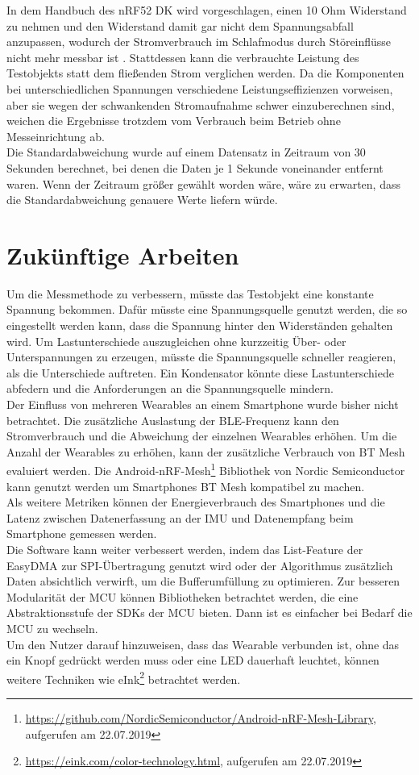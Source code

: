 In dem Handbuch des nRF52 DK wird vorgeschlagen, einen 10 Ohm Widerstand zu nehmen und den Widerstand damit gar nicht dem Spannungsabfall anzupassen, wodurch der Stromverbrauch im Schlafmodus durch Störeinflüsse nicht mehr messbar ist \cite{site_nrf52dk}.
Stattdessen kann die verbrauchte Leistung des Testobjekts statt dem fließenden Strom verglichen werden.
Da die Komponenten bei unterschiedlichen Spannungen verschiedene Leistungseffizienzen vorweisen, aber sie wegen der schwankenden Stromaufnahme schwer einzuberechnen sind, weichen die Ergebnisse trotzdem vom Verbrauch beim Betrieb ohne Messeinrichtung ab.\\
Die Standardabweichung wurde auf einem Datensatz in Zeitraum von 30 Sekunden berechnet, bei denen die Daten je 1 Sekunde voneinander entfernt waren.
Wenn der Zeitraum größer gewählt worden wäre, wäre zu erwarten, dass die Standardabweichung genauere Werte liefern würde.

\section{Zukünftige Arbeiten}
Um die Messmethode zu verbessern, müsste das Testobjekt eine konstante Spannung bekommen.
Dafür müsste eine Spannungsquelle genutzt werden, die so eingestellt werden kann, dass die Spannung hinter den Widerständen gehalten wird.
Um Lastunterschiede auszugleichen ohne kurzzeitig Über- oder Unterspannungen zu erzeugen, müsste die Spannungsquelle schneller reagieren, als die Unterschiede auftreten.
Ein Kondensator könnte diese Lastunterschiede abfedern und die Anforderungen an die Spannungsquelle mindern.\\
Der Einfluss von mehreren Wearables an einem Smartphone wurde bisher nicht betrachtet.
Die zusätzliche Auslastung der BLE-Frequenz kann den Stromverbrauch und die Abweichung der einzelnen Wearables erhöhen.
Um die Anzahl der Wearables zu erhöhen, kann der zusätzliche Verbrauch von BT Mesh evaluiert werden.
Die Android-nRF-Mesh\footnote{\url{https://github.com/NordicSemiconductor/Android-nRF-Mesh-Library}, aufgerufen am 22.07.2019} Bibliothek von Nordic Semiconductor kann genutzt werden um Smartphones BT Mesh kompatibel zu machen.\\
Als weitere Metriken können der Energieverbrauch des Smartphones und die Latenz zwischen Datenerfassung an der IMU und Datenempfang beim Smartphone gemessen werden.\\
Die Software kann weiter verbessert werden, indem das List-Feature der EasyDMA zur SPI-Übertragung \cite{datasheet_nrf52832} genutzt wird oder der Algorithmus zusätzlich Daten absichtlich verwirft, um die Bufferumfüllung zu optimieren.
Zur besseren Modularität der MCU können Bibliotheken betrachtet werden, die eine Abstraktionsstufe der SDKs der MCU bieten.
Dann ist es einfacher bei Bedarf die MCU zu wechseln.\\
Um den Nutzer darauf hinzuweisen, dass das Wearable verbunden ist, ohne das ein Knopf gedrückt werden muss oder eine LED dauerhaft leuchtet, können weitere Techniken wie eInk\footnote{\url{https://eink.com/color-technology.html}, aufgerufen am 22.07.2019} betrachtet werden.
